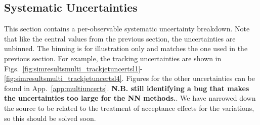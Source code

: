 \subsection{Systematic Uncertainties}
\label{sec:multifolduncerts}

This section contains a per-observable systematic uncertainty breakdown.  Note that like the central values from the previous section, the uncertainties are unbinned.  The binning is for illustration only and matches the one used in the previous section.  For example, the tracking uncertainties are shown in Figs.~\ref{fig:simresultsmulti_trackjetuncertsl1}-\ref{fig:simresultsmulti_trackjetuncertsl4}.  Figures for the other uncertainties can be found in App.~\ref{app:multiuncerts}.  \textbf{N.B. still identifying a bug that makes the uncertainties too large for the NN methods.}. We have narrowed down the source to be related to the treatment of acceptance effects for the variations, so this should be solved soon.



